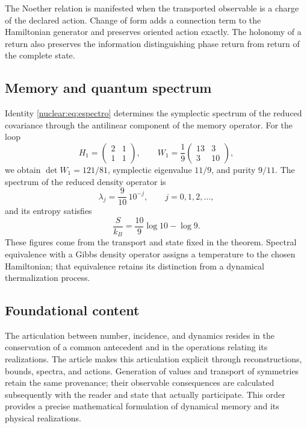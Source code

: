 The Noether relation is manifested when the transported observable is a charge of the declared action. Change of form adds a connection term to the Hamiltonian generator and preserves oriented action exactly. The holonomy of a return also preserves the information distinguishing phase return from return of the complete state.

\subsection{Memory and quantum spectrum}
Identity \eqref{nuclear:eq:espectro} determines the symplectic spectrum of the reduced covariance through the antilinear component of the memory operator. For the loop
\[
H_1=\begin{pmatrix}2&1\\1&1\end{pmatrix},
\qquad
W_1=\frac19\begin{pmatrix}13&3\\3&10\end{pmatrix},
\]
we obtain \(\det W_1=121/81\), symplectic eigenvalue \(11/9\), and purity \(9/11\). The spectrum of the reduced density operator is
\[
\lambda_j=\frac9{10}\,10^{-j},\qquad j=0,1,2,\ldots,
\]
and its entropy satisfies
\[
\frac{S}{k_B}=\frac{10}{9}\log10-\log9.
\]
These figures come from the transport and state fixed in the theorem. Spectral equivalence with a Gibbs density operator assigns a temperature to the chosen Hamiltonian; that equivalence retains its distinction from a dynamical thermalization process.

\subsection{Foundational content}
The articulation between number, incidence, and dynamics resides in the conservation of a common antecedent and in the operations relating its realizations. The article makes this articulation explicit through reconstructions, bounds, spectra, and actions. Generation of values and transport of symmetries retain the same provenance; their observable consequences are calculated subsequently with the reader and state that actually participate. This order provides a precise mathematical formulation of dynamical memory and its physical realizations.
